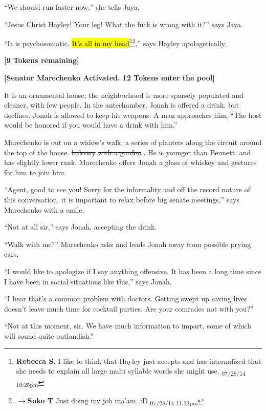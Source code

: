 ``We should run faster now,'' she tells Jaya.

``Jesus Christ Hayley!  Your leg!  What the fuck is wrong with it?'' says Jaya.

``It is psychosomatic.  \hl{It's all in my head}\footnote{\textbf{Rebecca S. }I like to think that Hayley just accepts and has internalized that she needs to explain all large multi syllable words she might use. \textsubscript{07/28/14 10:25pm}}\footnote{$\rightarrow$\textbf{Suko T }Just doing my job ma'am.  :D \textsubscript{07/28/14 11:13pm}},'' says Hayley apologetically.



\textbf{{[}9 Tokens remaining{]}}



\textbf{{[}Senator Marechenko Activated. 12 Tokens enter the pool{]}}



It is an ornamental house, the neighborhood is more sparsely populated and cleaner, with few people.  In the antechamber, Jonah is offered a drink, but declines.  Jonah is allowed to keep his weapons.  A man approaches him, ``The host would be honored if you would have a drink with him.''



Marechenko is out on a widow's walk, a series of planters along the circuit around the top of the house.\sout{ balcony }\sout{  with a garden }.  He is younger than Bennett, and has slightly lower rank.  Marechenko offers Jonah a glass of whiskey and gestures for him to join him.



``Agent, good to see you!  Sorry for the informality and off the record nature of this conversation, it is important to relax before big senate meetings,'' says Marechenko with a smile.

``Not at all sir,'' says Jonah, accepting the drink.

``Walk with me?'' Marechenko asks and leads Jonah away from possible prying ears.

``I would like to apologize if I say anything offensive.  It has been a long time since I have been in social situations like this,'' says Jonah.

``I hear that's a common problem with doctors.  Getting swept up saving lives doesn't leave much time for cocktail parties.  Are your comrades not with you?''

``Not at this moment, sir.  We have much information to impart, some of which will sound quite outlandish.''

